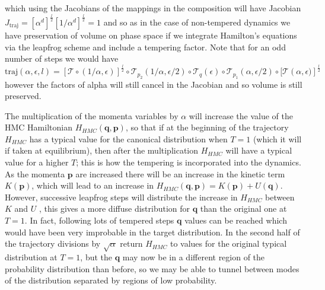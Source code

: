 \documentclass[12pt]{article}
\begin{document}
    which using the Jacobians of the mappings in the composition will have Jacobian $J_{\text{traj}}=\left[\alpha^d\right]^{\frac{l}{2}}\left[1/\alpha^d\right]^{\frac{l}{2}} = 1$ and so as in the case of non-tempered dynamics we have preservation of volume on phase space if we integrate Hamilton's equations via the leapfrog scheme and include a tempering factor. Note that for an odd number of steps we would have $\text{traj}\left(\alpha,\epsilon,l\right)=\left[\mathcal{T}\circ\left(1/\alpha,\epsilon\right)\right]^{\frac{l}{2}}\circ \mathcal{T}_{p_2}\left(1/\alpha,\epsilon/2\right)\circ\mathcal{T}_q\left(\epsilon\right)\circ\mathcal{T}_{p_1}\left(\alpha,\epsilon/2\right)\circ[\mathcal{T}\left(\alpha,\epsilon)\right]^{\frac{l}{2}}$ however the factors of alpha will still cancel in the Jacobian and so volume is still preserved.

    The multiplication of the momenta variables by $\alpha$ will increase the value of the HMC Hamiltonian $H_{HMC}\left(\bm{q},\bm{p}\right)$, so that if at the beginning of the trajectory $H_{HMC}$ has a typical value for the canonical distribution when $T=1$ (which it will if taken at equilibrium), then after the multiplication $H_{HMC}$ will have a typical value for a higher $T$; this is how the tempering is incorporated into the dynamics. As the momenta $\bm{p}$ are increased there will be an increase in the kinetic term $K\left(\bm{p}\right)$, which will lead to an increase in $H_{HMC}\left(\bm{q},\bm{p}\right) = K\left(\bm{p}\right) + U\left(\bm{q}\right)$. However, successive leapfrog steps will distribute the increase in $H_{HMC}$ between $K$ and $U$ \cite{neal_2011}, this gives a more diffuse distribution for $\bm{q}$ than the original one at $T=1$. In fact, following lots of tempered steps $\bm{q}$ values can be reached which would have been very improbable in the target distribution. In the second half of the trajectory divisions by $\sqrt{\alpha}$ return $H_{HMC}$ to values for the original typical distribution at $T=1$, but the $\bm{q}$ may now be in  a different region of the probability distribution than before, so we may be able to tunnel between modes of the distribution separated by regions of low probability.
\end{document}
